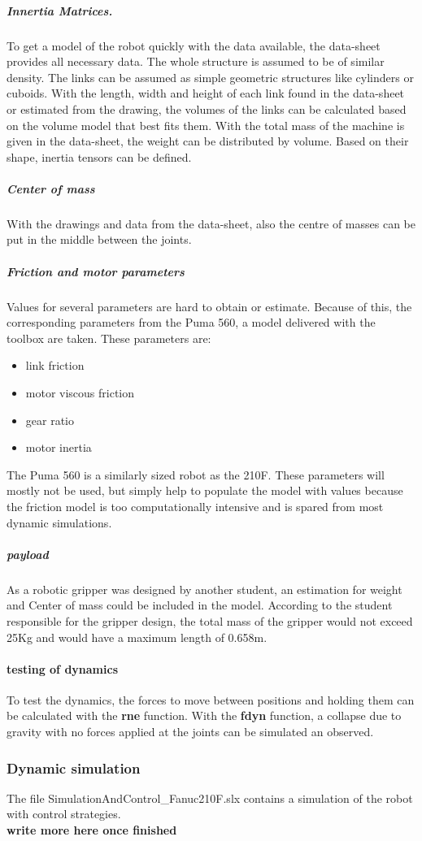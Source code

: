 \subparagraph{Innertia Matrices.}
To get a model of the robot quickly with the data available, the data-sheet \cite{210FDatasheet} provides all necessary data. The whole structure is assumed to be of similar density. The links can be assumed as simple geometric structures like cylinders or cuboids. With the length, width and height of each link found in the data-sheet or estimated from the drawing, the volumes of the links can be calculated based on the volume model that best fits them. With the total mass of the machine is given in the data-sheet, the weight can be distributed by volume. Based on their shape, inertia tensors can be defined.\\

\subparagraph{Center of mass}
With the drawings and data from the data-sheet, also the centre of masses can be put in the middle between the joints.

\subparagraph{Friction and motor parameters}
Values for several parameters are hard to obtain or estimate.
Because of this, the corresponding parameters from the Puma 560, a model delivered with the toolbox are taken. These parameters are:\\
\begin{itemize}
	\item link friction
	\item motor viscous friction
	\item gear ratio
	\item motor inertia
\end{itemize}
The Puma 560 is a similarly sized robot as the 210F. These parameters will mostly not be used, but simply help to populate the model with values because the friction model is too computationally intensive and is spared from most dynamic simulations.

\subparagraph{payload}
As a robotic gripper was designed by another student, an estimation for weight and Center of mass could be included in the model. According to the student responsible for the gripper design, the total mass of the gripper would not exceed 25Kg and would have a maximum length of 0.658m.

\paragraph{testing of dynamics}
To test the dynamics, the forces to move between positions and holding them can be calculated with the \textbf{rne} function.
With the \textbf{fdyn} function, a collapse due to gravity with no forces applied at the joints can be simulated an observed.
 
\subsubsection{Dynamic simulation}
The file SimulationAndControl_Fanuc210F.slx contains a simulation of the robot with control strategies.
\\

\textbf{write more here once finished}


